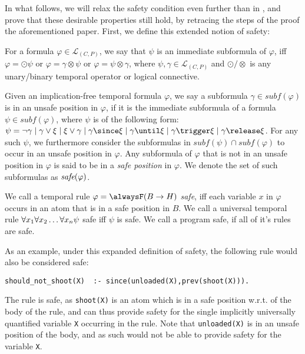 In what follows, we will relax the safety condition even further than
in \cite{agcapevidi17a}, and prove that these desirable properties
still hold, by retracing the steps of the proof the aforementioned
paper. First, we define this extended notion of safety:

\begin{definition}
  For a formula $\varphi \in \mathcal{L}_{(C,P)}$, we say
  that $\psi$ is an immediate subformula of $\varphi$, iff
  $\varphi = \odot \psi$ or $\varphi = \gamma \otimes \psi$ or
  $\varphi = \psi \otimes \gamma$, where
  $\psi, \gamma \in \mathcal{L}_{(C,P)}$ and
  $\odot/\otimes$ is any unary/binary temporal operator or logical
  connective.
\end{definition}

\begin{definition}[Safety]
  Given an implication-free temporal formula $\varphi$, we say a
  subformula $\gamma \in subf(\varphi)$ is in an unsafe position in
  $\varphi$, if it is the immediate subformula of a formula
  $\psi \in subf(\varphi)$, where $\psi$ is of the following form:
  $\psi = \neg \gamma \mid \gamma \vee \xi \mid \xi \vee \gamma \mid
  \gamma \since \xi \mid \gamma \until \xi \mid \gamma \trigger \xi
  \mid \gamma \release \xi$. For any such $\psi$, we furthermore
  consider the subformulas in $subf(\psi) \cap subf(\varphi)$ to occur
  in an unsafe position in $\varphi$. Any subformula of $\varphi$ that
  is not in an unsafe position in $\varphi$ is said to be in a
  \textit{safe position} in $\varphi$. We denote the set of such
  subformulas as $\textit{safe}(\varphi)$.

  We call a temporal rule $\varphi = \alwaysF(B \rightarrow H)$
  \emph{safe}, iff each variable $x$ in $\varphi$ occurs in an atom
  that is in a safe position in $B$. We call a universal temporal rule
  $\forall x_1 \forall x_2 \dots \forall x_n \psi$ safe iff $\psi$ is safe. We call a program safe, if
  all of it's rules are safe.
\end{definition}

As an example, under this expanded definition of safety, the following
rule would also be considered safe:

\begin{center}
    \begin{lstlisting}[numbers=none]
should_not_shoot(X)  :- since(unloaded(X),prev(shoot(X))).
    \end{lstlisting}
\end{center}

The rule is safe, as \verb|shoot(X)| is an atom which is in a safe
position w.r.t. of the body of the rule, and can thus provide safety
for the single implicitly universally quantified variable \verb|X|
occurring in the rule. Note that \verb|unloaded(X)| is in an unsafe
position of the body, and as such would not be able to provide safety
for the variable \verb|X|.

